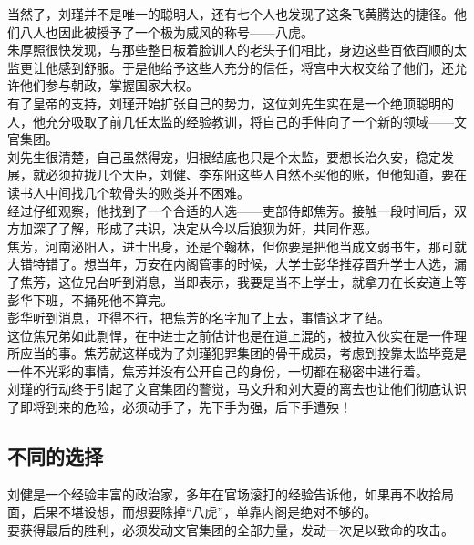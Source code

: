 \begin{multicols}{\theparacolNo}
当然了，刘瑾并不是唯一的聪明人，还有七个人也发现了这条飞黄腾达的捷径。他们八人也因此被授予了一个极为威风的称号——八虎。\\

朱厚照很快发现，与那些整日板着脸训人的老头子们相比，身边这些百依百顺的太监更让他感到舒服。于是他给予这些人充分的信任，将宫中大权交给了他们，还允许他们参与朝政，掌握国家大权。\\

有了皇帝的支持，刘瑾开始扩张自己的势力，这位刘先生实在是一个绝顶聪明的人，他充分吸取了前几任太监的经验教训，将自己的手伸向了一个新的领域——文官集团。\\

刘先生很清楚，自己虽然得宠，归根结底也只是个太监，要想长治久安，稳定发展，就必须拉拢几个大臣，刘健、李东阳这些人自然不买他的账，但他知道，要在读书人中间找几个软骨头的败类并不困难。\\

经过仔细观察，他找到了一个合适的人选——吏部侍郎焦芳。接触一段时间后，双方加深了了解，形成了共识，决定从今以后狼狈为奸，共同作恶。\\

焦芳，河南泌阳人，进士出身，还是个翰林，但你要是把他当成文弱书生，那可就大错特错了。想当年，万安在内阁管事的时候，大学士彭华推荐晋升学士人选，漏了焦芳，这位兄台听到消息，当即表示，我要是当不上学士，就拿刀在长安道上等彭华下班，不捅死他不算完。\\

彭华听到消息，吓得不行，把焦芳的名字加了上去，事情这才了结。\\

这位焦兄弟如此剽悍，在中进士之前估计也是在道上混的，被拉入伙实在是一件理所应当的事。焦芳就这样成为了刘瑾犯罪集团的骨干成员，考虑到投靠太监毕竟是一件不光彩的事情，焦芳并没有公开自己的身份，一切都在秘密中进行着。\\

刘瑾的行动终于引起了文官集团的警觉，马文升和刘大夏的离去也让他们彻底认识了即将到来的危险，必须动手了，先下手为强，后下手遭殃！\\

\subsection{不同的选择}
刘健是一个经验丰富的政治家，多年在官场滚打的经验告诉他，如果再不收拾局面，后果不堪设想，而想要除掉“八虎”，单靠内阁是绝对不够的。\\

要获得最后的胜利，必须发动文官集团的全部力量，发动一次足以致命的攻击。\\


\end{multicols}
